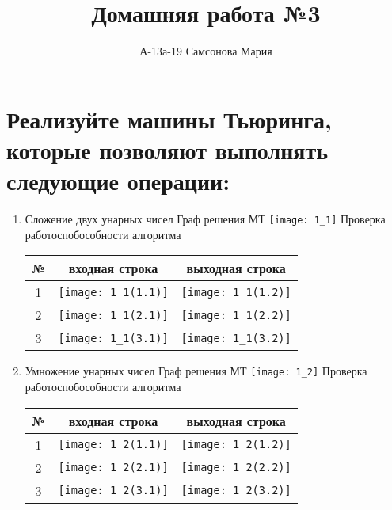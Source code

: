 \documentclass[a4paper, 12pt]{article}
\title{Домашняя работа №3}
\author{А-13а-19 Самсонова Мария}
\begin{document}
\maketitle

\section{Реализуйте машины Тьюринга, которые позволяют выполнять следующие операции:}
\begin{enumerate}
    \item Сложение двух унарных чисел 
    \newline
    Граф решения МТ
    \newline
    \texttt{[image: 1\_1]}
    \newline
    Проверка работоспобособности алгоритма
    \newline
    \begin{tabular}{|*{3}{c|}}
       \hline
       № & входная строка & выходная строка \\
       \hline
       1 & \texttt{[image: 1\_1(1.1)]} & \texttt{[image: 1\_1(1.2)]} \\ 
       \hline
       2 & \texttt{[image: 1\_1(2.1)]} & \texttt{[image: 1\_1(2.2)]} \\ 
       \hline
       3 & \texttt{[image: 1\_1(3.1)]} & \texttt{[image: 1\_1(3.2)]} \\
       \hline
    \end{tabular}
    
    \item Умножение унарных чисел 
    \newline
    Граф решения МТ
    \newline
    \texttt{[image: 1\_2]}
    \newline
    Проверка работоспобособности алгоритма
    \newline
    \begin{tabular}{|*{3}{c|}}
       \hline
       № & входная строка & выходная строка \\
       \hline
       1 & \texttt{[image: 1\_2(1.1)]} & \texttt{[image: 1\_2(1.2)]} \\ 
       \hline
       2 & \texttt{[image: 1\_2(2.1)]} & \texttt{[image: 1\_2(2.2)]} \\ 
       \hline
       3 & \texttt{[image: 1\_2(3.1)]} & \texttt{[image: 1\_2(3.2)]} \\
       \hline
    \end{tabular}
    

\end{enumerate}
\end{document}
